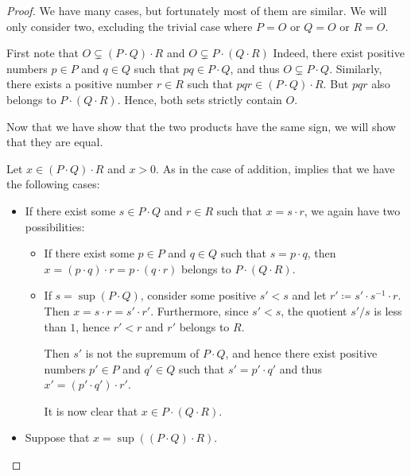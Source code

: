 \begin{proof}
   We have many cases, but fortunately most of them are similar. We will only consider two, excluding the trivial case where \( P = O \) or \( Q = O \) or \( R = O \).

   First note that \( O \subsetneq (P \cdot Q) \cdot R \) and \( O \subsetneq P \cdot (Q \cdot R) \) Indeed, there exist positive numbers \( p \in P \) and \( q \in Q \) such that \( pq \in P \cdot Q \), and thus \( O \subsetneq P \cdot Q \). Similarly, there exists a positive number \( r \in R \) such that \( pqr \in (P \cdot Q) \cdot R \). But \( pqr \) also belongs to \( P \cdot (Q \cdot R) \). Hence, both sets strictly contain \( O \).

  Now that we have show that the two products have the same sign, we will show that they are equal.

  Let \( x \in (P \cdot Q) \cdot R \) and \( x > 0 \). As in the case of addition,  implies that we have the following cases:
  \begin{itemize}
    \item If there exist some \( s \in P \cdot Q \) and \( r \in R \) such that \( x = s \cdot r \), we again have two possibilities:
    \begin{itemize}
      \item If there exist some \( p \in P \) and \( q \in Q \) such that \( s = p \cdot q \), then \( x = (p \cdot q) \cdot r = p \cdot (q \cdot r) \) belongs to \( P \cdot (Q \cdot R) \).

      \item If \( s = \sup(P \cdot Q) \), consider some positive \( s' < s \) and let \( r' \coloneqq s' \cdot s^{-1} \cdot r \). Then \( x = s \cdot r = s' \cdot r' \). Furthermore, since \( s' < s \), the quotient \( s' / s \) is less than \( 1 \), hence \( r' < r \) and \( r' \) belongs to \( R \).

      Then \( s' \) is not the supremum of \( P \cdot Q \), and hence there exist positive numbers \( p' \in P \) and \( q' \in Q \) such that \( s' = p' \cdot q' \) and thus \( x' = (p' \cdot q') \cdot r' \).

      It is now clear that \( x \in P \cdot (Q \cdot R) \).
    \end{itemize}

    \item Suppose that \( x = \sup((P \cdot Q) \cdot R) \).


\end{itemize}
\end{proof}
